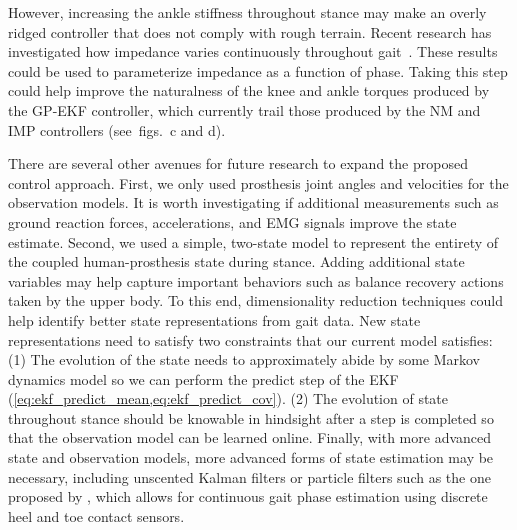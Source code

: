 However, increasing the ankle stiffness throughout stance may make an overly
ridged controller that does not comply with rough terrain. Recent research has
investigated how impedance varies continuously throughout
gait~\citep{lee2016summary}. These results could be used to parameterize
impedance as a function of phase. Taking this step could help improve the
naturalness of the knee and ankle torques produced by the GP-EKF controller,
which currently trail those produced by the NM and IMP controllers
(see~figs.~c and d).

There are several other avenues for future research to expand the proposed
control approach. First, we only used prosthesis joint angles and velocities for
the observation models. It is worth investigating if additional measurements
such as ground reaction forces, accelerations, and EMG signals improve the state
estimate.  Second, we used a simple, two-state model to represent the entirety
of the coupled human-prosthesis state during stance. Adding additional state
variables may help capture important behaviors such as balance recovery actions
taken by the upper body. To this end, dimensionality reduction techniques could
help identify better state representations from gait data. New state
representations need to satisfy two constraints that our current model
satisfies: (1) The evolution of the state needs to approximately abide by some
Markov dynamics model so we can perform the predict step of the EKF
(\cref{eq:ekf_predict_mean,eq:ekf_predict_cov}). (2) The evolution of state
throughout stance should be knowable in hindsight after a step is completed so
that the observation model can be learned online. Finally, with more advanced
state and observation models, more advanced forms of state estimation may be
necessary, including unscented Kalman filters or particle filters such as the
one proposed by \citet{dhir2018locomotion}, which allows for continuous gait
phase estimation using discrete heel and toe contact sensors. 
